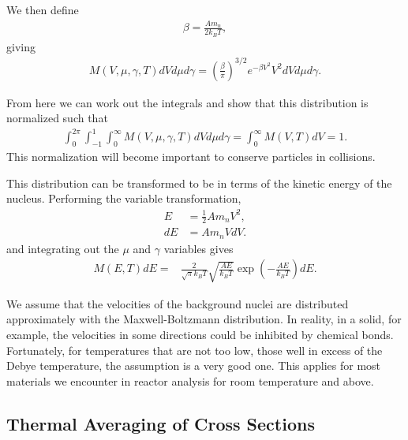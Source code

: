 We then define
\begin{align}
  \beta = \frac{A m_n}{ 2 k_B T },
\end{align}
giving
\begin{align}
  M(V,\mu,\gamma,T) dV d\mu d\gamma = \left( \frac{\beta}{\pi} \right)^{3/2} e^{-\beta V^2} V^2 dV d\mu d\gamma.
\end{align}

From here we can work out the integrals and show that this distribution is normalized such that
\begin{align}
  \int_0^{2\pi} \int_{-1}^1 \int_0^\infty  M(V,\mu,\gamma,T) dV d\mu d\gamma = \int_0^\infty M(V,T) dV = 1.
\end{align}
This normalization will become important to conserve particles in collisions.

This distribution can be transformed to be in terms of the kinetic energy of the nucleus. Performing the variable transformation,
\begin{align}
  E &= \frac{1}{2} A m_n V^2, \nonumber \\
  dE &= A m_n V dV . \nonumber
\end{align}
and integrating out the $\mu$ and $\gamma$ variables gives
\begin{align}
  M(E,T) dE 
  = &\frac{2}{\sqrt{\pi} k_B T} \sqrt{ \frac{A E}{k_B T} } \exp \left( -\frac{ AE }{ k_B T } \right) dE.
\end{align}

We assume that the velocities of the background nuclei are distributed approximately with the Maxwell-Boltzmann distribution. In reality, in a solid, for example, the velocities in some directions could be inhibited by chemical bonds. Fortunately, for temperatures that are not too low, those well in excess of the Debye temperature, the assumption is a very good one. This applies for most materials we encounter in reactor analysis for room temperature and above.

\subsection{Thermal Averaging of Cross Sections}


